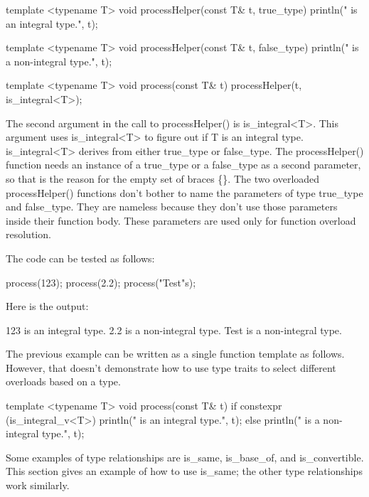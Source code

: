 \begin{cpp}
template <typename T>
void processHelper(const T& t, true_type)
{
    println("{} is an integral type.", t);
}

template <typename T>
void processHelper(const T& t, false_type)
{
    println("{} is a non-integral type.", t);
}

template <typename T>
void process(const T& t)
{
    processHelper(t, is_integral<T>{});
}
\end{cpp}

The second argument in the call to processHelper() is is\_integral<T>{}. This argument uses is\_integral<T> to figure out if T is an integral type. is\_integral<T> derives from either true\_type or false\_type. The processHelper() function needs an instance of a true\_type or a false\_type as a second parameter, so that is the reason for the empty set of braces \{\}. The two overloaded processHelper() functions don’t bother to name the parameters of type true\_type and false\_type. They are nameless because they don’t use those parameters inside their function body. These parameters are used only for function overload resolution.

The code can be tested as follows:

\begin{cpp}
process(123);
process(2.2);
process("Test"s);
\end{cpp}

Here is the output:

\begin{shell}
123 is an integral type.
2.2 is a non-integral type.
Test is a non-integral type.
\end{shell}

The previous example can be written as a single function template as follows. However, that doesn’t demonstrate how to use type traits to select different overloads based on a type.

\begin{cpp}
template <typename T>
void process(const T& t)
{
    if constexpr (is_integral_v<T>) {
        println("{} is an integral type.", t);
    } else {
        println("{} is a non-integral type.", t);
    }
}
\end{cpp}



Some examples of type relationships are is\_same, is\_base\_of, and is\_convertible. This section gives an example of how to use is\_same; the other type relationships work similarly.

